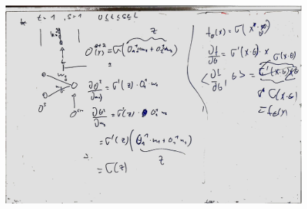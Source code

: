 \documentclass[a4paper]{article}
\begin{document}
\begin{figure}[htb]
	\centering
	\includegraphics[width=\textwidth]{whiteboard_notes/20180706_01.jpg}
\end{figure}
\end{document}

